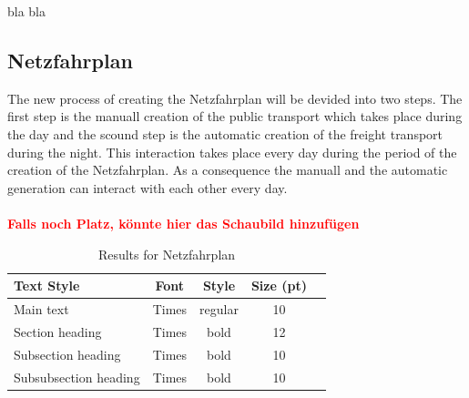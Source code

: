 bla bla

\subsection{Netzfahrplan}
\label{chap:Netzfahrplan}
The new process of creating the Netzfahrplan will be devided into two steps. The first step is the manuall creation of the 
public transport which takes place during the day and the scound step is the automatic creation of the freight transport during the night. This interaction takes place every day during the period of the creation of the Netzfahrplan. As a consequence the manuall and the automatic generation can interact with each other every day. \\
\\
\textbf{\textcolor{red}{Falls noch Platz, könnte hier das Schaubild hinzufügen}}
%
\begin{table}[h]
	\centering
	\caption{Results for Netzfahrplan}
	\label{tab:result_Netzfpl}
	\begin{tabular}{lcccc} \hline
		\textbf{Text Style}   & \textbf{Font} & \textbf{Style} & \textbf{Size (pt)} \\ \hline
		Main text             & Times         & regular        & 10                 \\
		Section heading       & Times         & bold           & 12                 \\
		Subsection heading    & Times         & bold           & 10                 \\
		Subsubsection heading & Times         & bold           & 10                 \\ \hline
	\end{tabular}
\end{table}
\par


